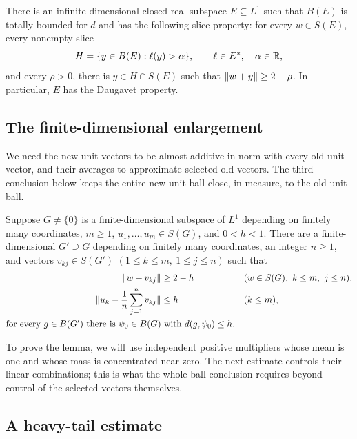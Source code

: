 \begin{theorem}\label{kw:existence}
There is an infinite-dimensional closed real subspace $E\subseteq L^1$
such that $B(E)$ is totally bounded for $d$ and has the following slice
property: for every $w\in S(E)$, every nonempty slice
\[
 H=\{y\in B(E):\ell(y)>\alpha\},\qquad \ell\in E^*,\quad\alpha\in\mathbb R,
\]
and every $\rho>0$, there is $y\in H\cap S(E)$ such that
$\lVert w+y\rVert\ge2-\rho$.  In particular, $E$ has the Daugavet property.
\end{theorem}

\subsection{The finite-dimensional enlargement}

We need the new unit vectors to be almost additive in norm with every
old unit vector, and their averages to approximate selected old vectors.
The third conclusion below keeps the entire new unit ball close, in
measure, to the old unit ball.

\begin{lemma}\label{kw:enlargement}
Suppose $G\ne\{0\}$ is a finite-dimensional subspace of $L^1$ depending
on finitely many coordinates, $m\ge1$, $u_1,\dots,u_m\in S(G)$, and $0<h<1$.
There are a finite-dimensional $G'\supseteq G$ depending on finitely
many coordinates, an integer $n\ge1$, and vectors
$v_{kj}\in S(G')$ $(1\le k\le m,\ 1\le j\le n)$ such that
\begin{align}
 \lVert w+v_{kj}\rVert&\ge2-h
 &&(w\in S(G),\ k\le m,\ j\le n),\label{kw:enlarge-a}\\
 \lVert u_k-\frac1n\sum_{j=1}^n v_{kj}\rVert&\le h
 &&(k\le m),\label{kw:enlarge-b}\\
 \text{for every }g\in B(G')\text{ there is }\psi_0\in B(G)
 &\text{ with }d(g,\psi_0)\le h.\label{kw:enlarge-c}
\end{align}
\end{lemma}

To prove the lemma, we will use independent positive multipliers whose
mean is one and whose mass is concentrated near zero.  The next estimate
controls their linear combinations; this is what the whole-ball
conclusion requires beyond control of the selected vectors themselves.

\subsection{A heavy-tail estimate}


